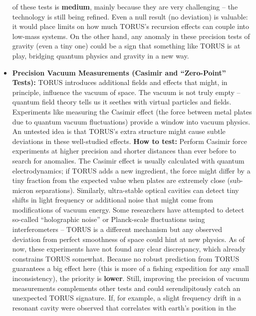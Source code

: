 \documentclass[
]{article}
\begin{document}
\begin{itemize}
  of these tests is \textbf{medium}, mainly because they are very
  challenging -- the technology is still being refined. Even a null
  result (no deviation) is valuable: it would place limits on how much
  TORUS's recursion effects can couple into low-mass
  systems\hspace{0pt}. On the other hand, any anomaly in these precision
  tests of gravity (even a tiny one) could be a sign that something like
  TORUS is at play, bridging quantum physics and gravity in a new way.
\item
  \textbf{Precision Vacuum Measurements (Casimir and ``Zero-Point''
  Tests):} TORUS introduces additional fields and effects that might, in
  principle, influence the vacuum of space. The vacuum is not truly
  empty -- quantum field theory tells us it seethes with virtual
  particles and fields. Experiments like measuring the Casimir effect
  (the force between metal plates due to quantum vacuum fluctuations)
  provide a window into vacuum physics. An untested idea is that TORUS's
  extra structure might cause subtle deviations in these well-studied
  effects. \textbf{How to test:} Perform Casimir force experiments at
  higher precision and shorter distances than ever before to search for
  anomalies\hspace{0pt}. The Casimir effect is usually calculated with
  quantum electrodynamics; if TORUS adds a new ingredient, the force
  might differ by a tiny fraction from the expected value when plates
  are extremely close (sub-micron separations). Similarly, ultra-stable
  optical cavities can detect tiny shifts in light frequency or
  additional noise that might come from modifications of vacuum energy.
  Some researchers have attempted to detect so-called ``holographic
  noise'' or Planck-scale fluctuations using interferometers -- TORUS is
  a different mechanism but any observed deviation from perfect
  smoothness of space could hint at new physics\hspace{0pt}. As of now,
  these experiments have not found any clear discrepancy, which already
  constrains TORUS somewhat. Because no robust prediction from TORUS
  guarantees a big effect here (this is more of a fishing expedition for
  any small inconsistency), the priority is \textbf{lower}\hspace{0pt}.
  Still, improving the precision of vacuum measurements complements
  other tests and could serendipitously catch an unexpected TORUS
  signature. If, for example, a slight frequency drift in a resonant
  cavity were observed that correlates with earth's position in the

\end{itemize}
\end{document}

